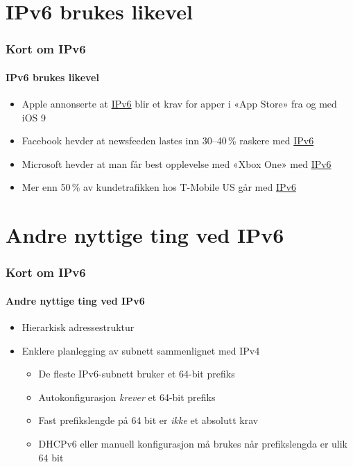 \section{IPv6 brukes likevel}
\begin{frame}%
  \frametitle{Kort om IPv6}
  \framesubtitle{IPv6 brukes likevel}
  \begin{itemize}%
  \item Apple annonserte at
    \href{https://developer.apple.com/videos/wwdc/2015/?id=102}{IPv6}
    blir et krav for apper i «App Store» fra og med iOS 9
  \item Facebook hevder at newsfeeden lastes inn 30--40\,\% raskere
    med
    \href{https://www.youtube.com/watch?v=An7s25FSK0U&feature=youtu.be&t=18m54s}{IPv6}
  \item Microsoft hevder at man får best opplevelse med «Xbox One» med
    \href{http://www.internetsociety.org/deploy360/blog/2013/10/microsoft-the-best-xbox-one-gaming-experience-will-be-over-ipv6/}{IPv6}
  \item Mer enn 50\,\% av kundetrafikken hos T-Mobile US går med
    \href{https://conference.apnic.net/data/37/464xlat-apricot-2014_1393236641.pdf}{IPv6}
  \end{itemize}
\end{frame}

\section{Andre nyttige ting ved IPv6}
\begin{frame}%
  \frametitle{Kort om IPv6}
  \framesubtitle{Andre nyttige ting ved IPv6}
  \begin{itemize}%
  \item Hierarkisk adressestruktur
  \item Enklere planlegging av subnett sammenlignet med IPv4
    \begin{itemize}%
    \item De fleste IPv6-subnett bruker et 64-bit prefiks
    \item Autokonfigurasjon \textit{krever\/} et 64-bit prefiks
    \item Fast prefikslengde på 64 bit er \textit{ikke\/} et absolutt
      krav
    \item DHCPv6 eller manuell konfigurasjon må brukes når
      prefikslengda er ulik 64 bit
    \end{itemize}
  \end{itemize}
\end{frame}

